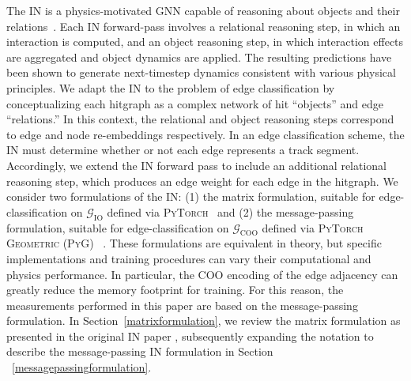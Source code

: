 \documentclass[twocolumn]{svjour3}
\begin{document}
The IN is a physics-motivated GNN capable of reasoning about objects and their relations~\cite{IN}. 
Each IN forward-pass involves a relational reasoning step, in which an interaction is computed, and an object reasoning step, in which interaction effects are aggregated and object dynamics are applied. 
The resulting predictions have been shown to generate next-timestep dynamics consistent with various physical principles. 
We adapt the IN to the problem of edge classification by conceptualizing each hitgraph as a complex network of hit ``objects'' and edge ``relations.''
In this context, the relational and object reasoning steps correspond to edge and node re-embeddings respectively. 
In an edge classification scheme, the IN must determine whether or not each edge represents a track segment. 
Accordingly, we extend the IN forward pass to include an additional relational reasoning step, which produces an edge weight for each edge in the hitgraph. 
We consider two formulations of the IN: (1) the matrix formulation, suitable for edge-classification on $\mathcal{G}_\mathrm{IO}$ defined via \textsc{PyTorch}~\cite{pytorch} and (2) the message-passing formulation, suitable for edge-classification on $\mathcal{G}_\mathrm{COO}$ defined via \textsc{PyTorch Geometric} (\textsc{PyG}) ~\cite{fey2019fast}. 
These formulations are equivalent in theory, but specific implementations and training procedures can vary their computational and physics performance. 
In particular, the COO encoding of the edge adjacency can greatly reduce the memory footprint for training. 
For this reason, the measurements performed in this paper are based on the message-passing formulation. 
In Section~\ref{matrixformulation}, we review the matrix formulation as presented in the original IN paper \cite{IN}, subsequently expanding the notation to describe the message-passing IN formulation in Section ~\ref{messagepassingformulation}. 
\end{document}
